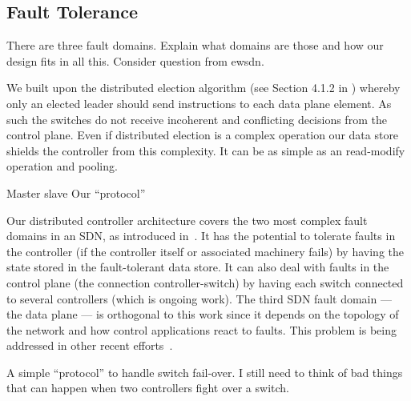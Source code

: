 \subsection{Fault Tolerance}
\label{sec:heimdall:fault-tolerance}

There are three fault domains. Explain what domains are those and how our design fits in all this. Consider question from ewsdn. 

We built upon the distributed election algorithm (see Section 4.1.2 in
\cite{4d}) whereby only an elected leader should send instructions to
each data plane element. 
As such the switches do not receive incoherent and conflicting
decisions from the control plane. 
Even if distributed election is a complex operation our data store
shields the controller from this complexity. It can be as simple as an
read-modify operation and pooling. 


Master slave
Our ``protocol''

Our distributed controller architecture covers the two most complex fault domains in an SDN, as introduced in~\cite{kim2012}.
It has the potential to tolerate faults in the controller (if the controller itself or associated machinery fails) by having the state stored in the fault-tolerant data store.
It can also deal with faults in the control plane (the connection controller-switch) by having each switch connected to several controllers (which is ongoing work).
The third SDN fault domain --- the data plane --- is orthogonal to this work since it depends on the topology of the network and how control applications react to faults.
This problem is being addressed in other recent
efforts~\cite{kim2012,Reitblatt2013}.


A simple ``protocol'' to handle switch fail-over. I still need to think of bad things that can happen when two controllers fight over a switch.
